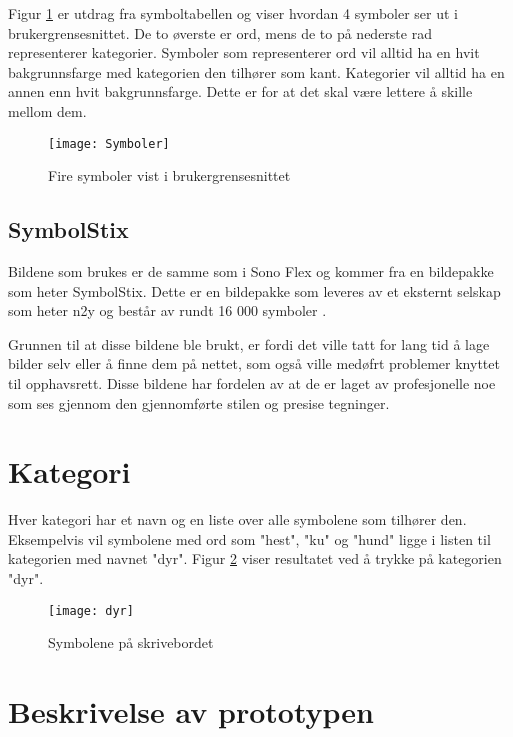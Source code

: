 Figur \ref{fig:symb} er utdrag fra symboltabellen og viser hvordan 4 symboler ser ut i brukergrensesnittet. De to øverste er ord, mens de to på nederste rad representerer kategorier. Symboler som representerer ord vil alltid ha en hvit bakgrunnsfarge med kategorien den tilhører som kant. Kategorier vil alltid ha en annen enn hvit bakgrunnsfarge. Dette er for at det skal være lettere å skille mellom dem.

 \begin{figure}[ht!] 
\centering 
\texttt{[image: Symboler]} 
\caption{Fire symboler vist i brukergrensesnittet} 
\label{fig:symb} 
\end{figure} 

\subsection{SymbolStix}

Bildene som brukes er de samme som i Sono Flex og kommer fra en bildepakke som heter SymbolStix. Dette er en bildepakke som leveres av et eksternt selskap som heter n2y og består av rundt 16 000 symboler \cite{n2y}. 

Grunnen til at disse bildene ble brukt, er fordi det ville tatt for lang tid å lage bilder selv eller å finne dem på nettet, som også ville medøfrt problemer knyttet til opphavsrett. Disse bildene har fordelen av at de er laget av profesjonelle noe som ses gjennom den gjennomførte stilen og presise tegninger.


\section{Kategori}

Hver kategori har et navn og en liste over alle symbolene som tilhører den. Eksempelvis vil symbolene med ord som "hest", "ku" og "hund" ligge i listen til kategorien med navnet "dyr". Figur \ref{fig:katego} viser resultatet ved å trykke på kategorien "dyr". 

\begin{figure}[ht!] 
\centering 
\texttt{[image: dyr]} 
\caption{Symbolene på skrivebordet} 
\label{fig:katego} 
\end{figure} 



 
\section{Beskrivelse av prototypen} 

